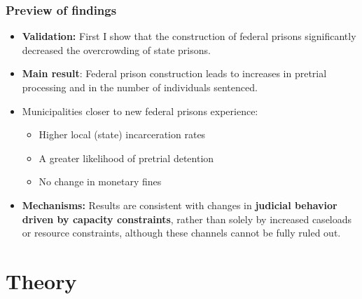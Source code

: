 \documentclass[10pt,aspectratio=169]{beamer}
\begin{document}
\begin{frame}
\frametitle{Preview of findings}
\small
\begin{itemize}\setlength\itemsep{0.7em}

    \item \textbf{Validation:} First I show that the \alert{construction of federal prisons} significantly \alert{decreased the overcrowding of state prisons}.
    \pause
    \item \textbf{Main result}: Federal prison construction leads to \alert{increases in pretrial processing} and in the \alert{number of individuals sentenced}.
    \pause
    \item Municipalities closer to new federal prisons experience:
    \begin{itemize}
        \item Higher \alert{local (state) incarceration rates}
        \item A greater likelihood of \alert{pretrial detention}
        \item \alert{No change} in monetary fines
    \end{itemize}
    \pause
    \item \textbf{Mechanisms:} Results are consistent with changes in \textbf{judicial behavior driven by capacity constraints}, rather than solely by increased caseloads or resource constraints, although these channels cannot be fully ruled out.
    
    
\end{itemize}
\end{frame}

\section{Theory}
\end{document}

